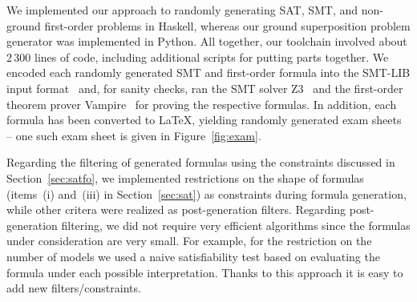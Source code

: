We implemented our approach to randomly generating
SAT, SMT, and non-ground first-order problems in Haskell, whereas
our ground superposition problem generator was implemented in
Python. All together, our toolchain involved about 2\,300 lines of code,
including additional scripts for putting parts together.
We encoded each randomly generated SMT and first-order formula into
the SMT-LIB input format~\cite{barrett2017smtlib} and, for sanity checks, ran the SMT
solver Z3~\cite{Z3}  and the first-order theorem prover
Vampire~\cite{Vampire13} for proving the respective formulas.
In addition, each formula has been converted  to \LaTeX{}, yielding
randomly generated exam sheets -- one such exam sheet is given in
Figure~\ref{fig:exam}.

Regarding the filtering of generated formulas using the constraints discussed in Section~\ref{sec:satfo},
we implemented restrictions on the shape of formulas (items~(i) and~(iii) in Section~\ref{sec:sat}) as constraints during formula generation,
while other critera were realized as post-generation filters.
Regarding post-generation filtering, we did not require very efficient algorithms since the formulas under consideration are very small.
For example, for the restriction on the number of models we used a naive satisfiability test
based on evaluating the formula under each possible interpretation.
Thanks to this approach it is easy to add new filters/constraints.


